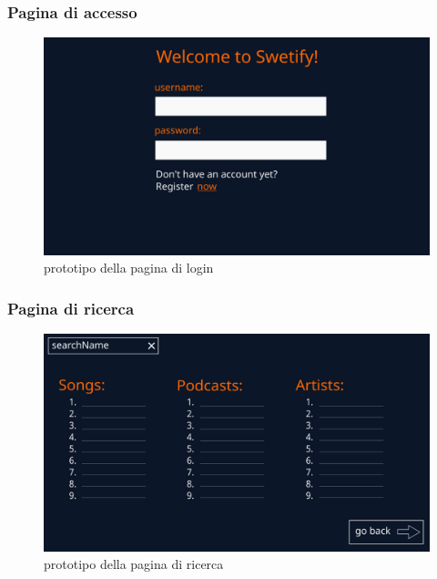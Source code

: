 \documentclass{article}
\begin{document}
  \subsubsection{Pagina di accesso}
  \begin{figure}[H]
    \centering
    \includegraphics[scale=0.25]{welcome}
    \caption{prototipo della pagina di login}
    \label{fig:loginPage}
  \end{figure}

  \subsubsection{Pagina di ricerca}
  \begin{figure}[H]
    \centering
    \includegraphics[scale=0.25]{search}
    \caption{prototipo della pagina di ricerca}
    \label{fig:searchPage}
  \end{figure}
\end{document}
